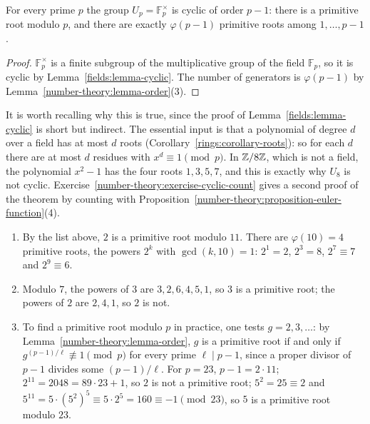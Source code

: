 \begin{theorem}\label{number-theory:theorem-primitive-root-prime}
For every prime $p$ the group $U_p = \mathbb{F}_p^\times$ is cyclic of order $p - 1$: there is a primitive root modulo $p$, and there are exactly $\varphi(p - 1)$ primitive roots among $1, \ldots, p - 1$.
\end{theorem}

\begin{proof}
$\mathbb{F}_p^\times$ is a finite subgroup of the multiplicative group of the field $\mathbb{F}_p$, so it is cyclic by Lemma~\ref{fields:lemma-cyclic}. The number of generators is $\varphi(p - 1)$ by
Lemma~\ref{number-theory:lemma-order}(3).
\end{proof}

It is worth recalling why this is true, since the proof of Lemma~\ref{fields:lemma-cyclic} is short but indirect. The essential input is that a polynomial of degree $d$ over a field has at most $d$ roots
(Corollary~\ref{rings:corollary-roots}): so for each $d$ there are at most $d$ residues with $x^d \equiv 1 \pmod p$. In $\mathbb{Z}/8\mathbb{Z}$, which is not a field, the polynomial $x^2 - 1$ has the four roots
$1, 3, 5, 7$, and this is exactly why $U_8$ is not cyclic. Exercise~\ref{number-theory:exercise-cyclic-count} gives a second proof of the theorem by counting with
Proposition~\ref{number-theory:proposition-euler-function}(4).

\begin{example}\label{number-theory:example-primitive-roots}
\begin{enumerate}
\item By the list above, $2$ is a primitive root modulo $11$. There are $\varphi(10) = 4$ primitive roots, the powers $2^k$ with $\gcd(k, 10) = 1$: $2^1 = 2$, $2^3 = 8$, $2^7 \equiv 7$ and $2^9 \equiv 6$.
\item Modulo $7$, the powers of $3$ are $3, 2, 6, 4, 5, 1$, so $3$ is a primitive root; the powers of $2$ are $2, 4, 1$, so $2$ is not.
\item To find a primitive root modulo $p$ in practice, one tests $g = 2, 3, \ldots$: by Lemma~\ref{number-theory:lemma-order}, $g$ is a primitive root if and only if $g^{(p-1)/\ell} \not\equiv 1 \pmod p$
for every prime $\ell \mid p - 1$, since a proper divisor of $p - 1$ divides some $(p - 1)/\ell$. For $p = 23$, $p - 1 = 2 \cdot 11$; $2^{11} = 2048 = 89 \cdot 23 + 1$, so $2$ is not a primitive root;
$5^2 = 25 \equiv 2$ and $5^{11} = 5 \cdot (5^2)^5 \equiv 5 \cdot 2^5 = 160 \equiv -1 \pmod{23}$, so $5$ is a primitive root modulo $23$.
\end{enumerate}
\end{example}

